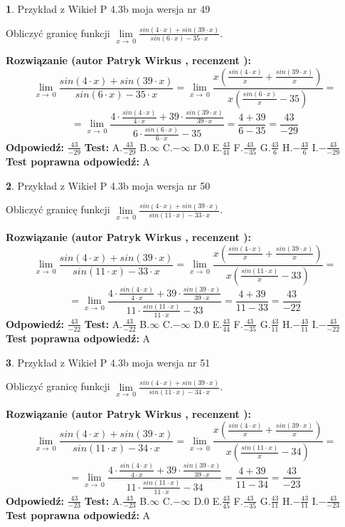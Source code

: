 \documentclass[12pt, a4paper]{article}
\theoremstyle{definition} %
\newtheorem{zad}{}
\newcommand{\zadStart}[1]{\begin{zad}#1\newline}
\newcommand{\zadStop}{\end{zad}}
\newcommand{\rozwStart}[2]{\noindent \textbf{Rozwiązanie (autor #1 , recenzent #2): }\newline}
\newcommand{\rozwStop}{\newline}
\newcommand{\odpStart}{\noindent \textbf{Odpowiedź:}\newline}
\newcommand{\odpStop}{\newline}
\newcommand{\testStart}{\noindent \textbf{Test:}\newline}
\newcommand{\testStop}{\newline}
\newcommand{\kluczStart}{\noindent \textbf{Test poprawna odpowiedź:}\newline}
\newcommand{\kluczStop}{\newline}
\begin{document}
\zadStart{Przykład z Wikieł P 4.3b moja wersja nr 49}


Obliczyć granicę funkcji $\lim\limits_{x\to\ 0}\frac{sin(4 \cdot x)+sin(39 \cdot x)}{sin(6 \cdot x)-35 \cdot x}$.
\zadStop
\rozwStart{Patryk Wirkus}{}
$$\lim\limits_{x\to\ 0}\frac{sin(4 \cdot x)+sin(39 \cdot x)}{sin(6 \cdot x)-35 \cdot x}=\lim\limits_{x\to\ 0}\frac{x(\frac{sin(4 \cdot x)}{x}+\frac{sin(39 \cdot x)}{x})}{x(\frac{sin(6 \cdot x)}{x}-35)}=$$
$$=\lim\limits_{x\to\ 0}\frac{4 \cdot \frac{sin(4 \cdot x)}{4 \cdot x}+39 \cdot \frac{sin(39 \cdot x)}{39 \cdot x}}{6 \cdot \frac{sin(6 \cdot x)}{6 \cdot x}-35}=\frac{4+39}{6-35} = \frac{43}{-29}$$
\rozwStop
\odpStart
$\frac{43}{-29}$
\odpStop
\testStart
A.$\frac{43}{-29}$
B.$\infty$
C.$-\infty$
D.$0$
E.$\frac{43}{41}$
F.$\frac{43}{-35}$
G.$\frac{43}{6}$
H.$-\frac{43}{6}$
I.$-\frac{43}{-29}$
\testStop
\kluczStart
A
\kluczStop



\zadStart{Przykład z Wikieł P 4.3b moja wersja nr 50}


Obliczyć granicę funkcji $\lim\limits_{x\to\ 0}\frac{sin(4 \cdot x)+sin(39 \cdot x)}{sin(11 \cdot x)-33 \cdot x}$.
\zadStop
\rozwStart{Patryk Wirkus}{}
$$\lim\limits_{x\to\ 0}\frac{sin(4 \cdot x)+sin(39 \cdot x)}{sin(11 \cdot x)-33 \cdot x}=\lim\limits_{x\to\ 0}\frac{x(\frac{sin(4 \cdot x)}{x}+\frac{sin(39 \cdot x)}{x})}{x(\frac{sin(11 \cdot x)}{x}-33)}=$$
$$=\lim\limits_{x\to\ 0}\frac{4 \cdot \frac{sin(4 \cdot x)}{4 \cdot x}+39 \cdot \frac{sin(39 \cdot x)}{39 \cdot x}}{11 \cdot \frac{sin(11 \cdot x)}{11 \cdot x}-33}=\frac{4+39}{11-33} = \frac{43}{-22}$$
\rozwStop
\odpStart
$\frac{43}{-22}$
\odpStop
\testStart
A.$\frac{43}{-22}$
B.$\infty$
C.$-\infty$
D.$0$
E.$\frac{43}{44}$
F.$\frac{43}{-35}$
G.$\frac{43}{11}$
H.$-\frac{43}{11}$
I.$-\frac{43}{-22}$
\testStop
\kluczStart
A
\kluczStop



\zadStart{Przykład z Wikieł P 4.3b moja wersja nr 51}


Obliczyć granicę funkcji $\lim\limits_{x\to\ 0}\frac{sin(4 \cdot x)+sin(39 \cdot x)}{sin(11 \cdot x)-34 \cdot x}$.
\zadStop
\rozwStart{Patryk Wirkus}{}
$$\lim\limits_{x\to\ 0}\frac{sin(4 \cdot x)+sin(39 \cdot x)}{sin(11 \cdot x)-34 \cdot x}=\lim\limits_{x\to\ 0}\frac{x(\frac{sin(4 \cdot x)}{x}+\frac{sin(39 \cdot x)}{x})}{x(\frac{sin(11 \cdot x)}{x}-34)}=$$
$$=\lim\limits_{x\to\ 0}\frac{4 \cdot \frac{sin(4 \cdot x)}{4 \cdot x}+39 \cdot \frac{sin(39 \cdot x)}{39 \cdot x}}{11 \cdot \frac{sin(11 \cdot x)}{11 \cdot x}-34}=\frac{4+39}{11-34} = \frac{43}{-23}$$
\rozwStop
\odpStart
$\frac{43}{-23}$
\odpStop
\testStart
A.$\frac{43}{-23}$
B.$\infty$
C.$-\infty$
D.$0$
E.$\frac{43}{45}$
F.$\frac{43}{-35}$
G.$\frac{43}{11}$
H.$-\frac{43}{11}$
I.$-\frac{43}{-23}$
\testStop
\kluczStart
A
\kluczStop
\end{document}
